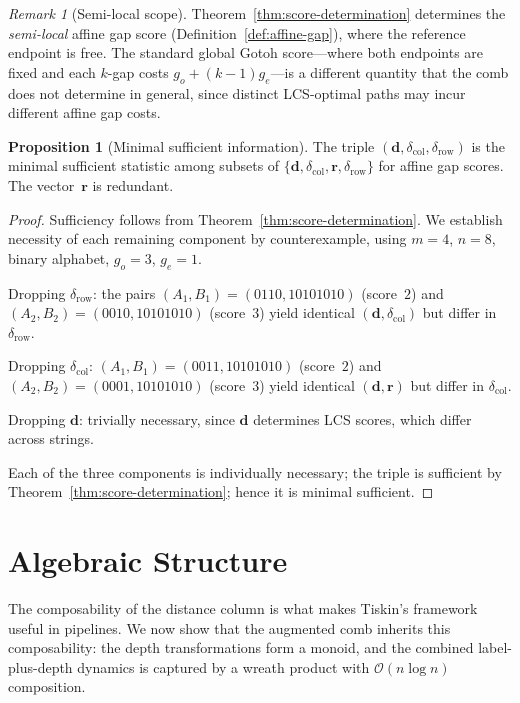 \documentclass[11pt, a4paper]{article}
\theoremstyle{definition}
\newtheorem{proposition}[theorem]{Proposition}
\theoremstyle{remark}
\newtheorem{remark}[theorem]{Remark}
\newcommand{\dcol}{\mathbf{d}}
\newcommand{\drow}{\mathbf{r}}
\newcommand{\bigO}{\mathcal{O}}
\begin{document}
\begin{remark}[Semi-local scope]
\label{rem:semi-local}
Theorem~\ref{thm:score-determination} determines the \emph{semi-local}
affine gap score (Definition~\ref{def:affine-gap}), where the reference
endpoint is free.
The standard global Gotoh score---where both endpoints
are fixed and each $k$-gap costs $g_o + (k{-}1)g_e$---is a different
quantity that the comb does not determine in general, since distinct
LCS-optimal paths may incur different affine gap costs.
\end{remark}

\begin{proposition}[Minimal sufficient information]
\label{prop:minimal-sufficient}
The triple
$(\dcol, \delta_{\mathrm{col}}, \delta_{\mathrm{row}})$ is
the minimal sufficient statistic among subsets of
$\{\dcol, \delta_{\mathrm{col}}, \drow,
\delta_{\mathrm{row}}\}$ for affine gap scores.
The
vector~$\drow$ is redundant.
\end{proposition}

\begin{proof}
Sufficiency follows from Theorem~\ref{thm:score-determination}.
We establish necessity of each remaining component by
counterexample, using $m{=}4$, $n{=}8$, binary alphabet,
$g_o{=}3$, $g_e{=}1$.

Dropping $\delta_{\mathrm{row}}$: the pairs
$(A_1, B_1) = (0110,\allowbreak 10101010)$ (score~$2$) and
$(A_2, B_2) = (0010,\allowbreak 10101010)$ (score~$3$) yield
identical $(\dcol, \delta_{\mathrm{col}})$ but differ in
$\delta_{\mathrm{row}}$.

Dropping $\delta_{\mathrm{col}}$:
$(A_1, B_1) = (0011,\allowbreak 10101010)$ (score~$2$) and
$(A_2, B_2) = (0001,\allowbreak 10101010)$ (score~$3$) yield
identical $(\dcol, \drow)$ but differ in
$\delta_{\mathrm{col}}$.

Dropping $\dcol$: trivially necessary, since $\dcol$
determines LCS scores, which differ across strings.

Each of the three components is individually necessary;
the
triple is sufficient by
Theorem~\ref{thm:score-determination}; hence it is minimal
sufficient.
\end{proof}

\section{Algebraic Structure}\label{sec:algebra}

The composability of the distance column is what makes Tiskin's
framework useful in pipelines.
We now show that the augmented comb
inherits this composability: the depth transformations form a monoid,
and the combined label-plus-depth dynamics is captured by a wreath
product with $\bigO(n \log n)$ composition.
\end{document}
